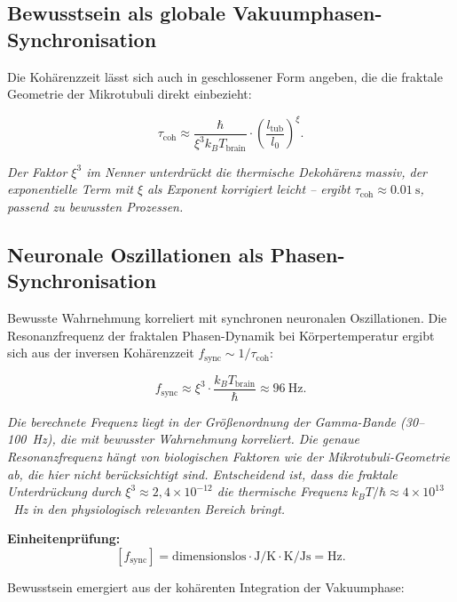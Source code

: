 	\subsection*{Bewusstsein als globale Vakuumphasen-Synchronisation}
	
	Die Kohärenzzeit lässt sich auch in geschlossener Form angeben, die die fraktale Geometrie der Mikrotubuli direkt einbezieht:
	
	\begin{equation}
		\tau_{\text{coh}} \approx \frac{\hbar}{\xi^3 k_B T_{\text{brain}}} \cdot \left( \frac{l_{\text{tub}}}{l_0} \right)^{\xi}.
	\end{equation}
	
	\textit{Der Faktor \(\xi^3\) im Nenner unterdrückt die thermische Dekohärenz massiv, der exponentielle Term mit \(\xi\) als Exponent korrigiert leicht – ergibt \(\tau_{\text{coh}} \approx \SI{0.01}{\second}\), passend zu bewussten Prozessen.}
	
	\subsection*{Neuronale Oszillationen als Phasen-Synchronisation}
	
	Bewusste Wahrnehmung korreliert mit synchronen neuronalen Oszillationen. Die Resonanzfrequenz der fraktalen Phasen-Dynamik bei Körpertemperatur ergibt sich aus der inversen Kohärenzzeit \(f_{\text{sync}} \sim 1/\tau_{\text{coh}}\):
	
	\begin{equation}
		f_{\text{sync}} \approx \xi^{3} \cdot \frac{k_B T_{\text{brain}}}{\hbar} \approx \SI{96}{\hertz}.
	\end{equation}
	
	\textit{Die berechnete Frequenz liegt in der Größenordnung der Gamma-Bande (30–100~Hz), die mit bewusster Wahrnehmung korreliert. Die genaue Resonanzfrequenz hängt von biologischen Faktoren wie der Mikrotubuli-Geometrie ab, die hier nicht berücksichtigt sind. Entscheidend ist, dass die fraktale Unterdrückung durch \(\xi^3 \approx 2{,}4 \times 10^{-12}\) die thermische Frequenz \(k_B T/\hbar \approx 4 \times 10^{13}\)~Hz in den physiologisch relevanten Bereich bringt.}
	
	\textbf{Einheitenprüfung:}
	\[
	[f_{\text{sync}}] = \text{dimensionslos} \cdot \si{\joule\per\kelvin} \cdot \si{\kelvin} / \si{\joule\second} = \si{\hertz}.
	\]
	
	Bewusstsein emergiert aus der kohärenten Integration der Vakuumphase:
	
